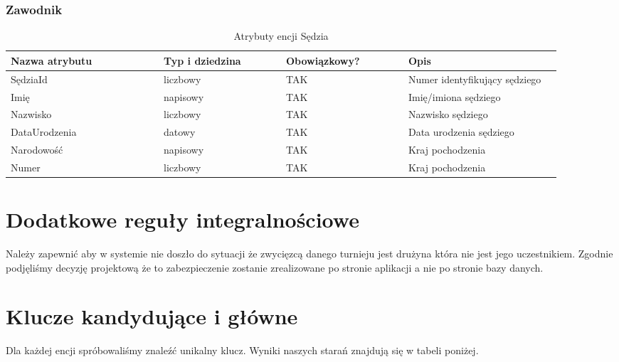 \documentclass{mwrep}[15pt]
\begin{document}
\subsubsection{Zawodnik}
\begin{table}[H]
	\begin{tabular}{|p{0.25\linewidth}|p{0.2\linewidth}|p{0.2\linewidth}|p{0.25\linewidth}|}
	\hline
	Nazwa atrybutu & Typ i dziedzina & Obowiązkowy? & Opis                                                           \\ \hline
	SędziaId   & liczbowy                            & TAK                              & Numer identyfikujący sędziego                                                   \\ \hline
	Imię         & napisowy                           & TAK                              & Imię/imiona sędziego        \\ \hline
	Nazwisko	   & liczbowy							& TAK								& Nazwisko sędziego \\  \hline
	DataUrodzenia          & datowy                           & TAK                              & Data urodzenia sędziego              \\ \hline
	Narodowość           & napisowy                            & TAK                              & Kraj pochodzenia   \\ \hline
	Numer           & liczbowy                            & TAK                              & Kraj pochodzenia   \\ \hline
	\end{tabular}
	\caption{Atrybuty encji Sędzia}
\end{table}

\section{Dodatkowe reguły integralnościowe}

Należy zapewnić aby w systemie nie doszło do sytuacji że zwycięzcą danego turnieju jest drużyna która nie jest jego uczestnikiem.
Zgodnie podjęliśmy decyzję projektową że to zabezpieczenie zostanie zrealizowane po stronie aplikacji a nie po stronie bazy danych.

\vspace{2cm}
\section{Klucze kandydujące i główne}

Dla każdej encji spróbowaliśmy znaleźć unikalny klucz. Wyniki naszych starań znajdują się w
tabeli poniżej.
\end{document}
